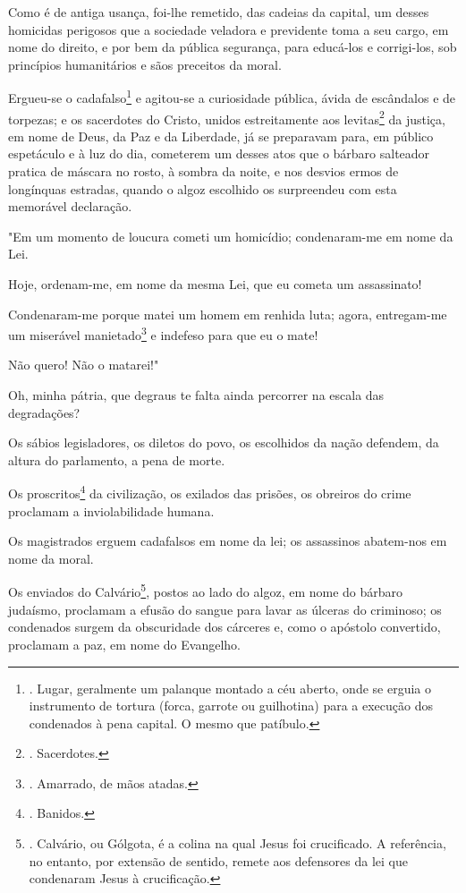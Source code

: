 Como é de antiga usança, foi-lhe remetido, das cadeias da capital, um
desses homicidas perigosos que a sociedade veladora e previdente toma a
seu cargo, em nome do direito, e por bem da pública segurança, para
educá-los e corrigi-los, sob princípios humanitários e sãos preceitos da
moral.

Ergueu-se o cadafalso\footnote{. Lugar, geralmente um palanque montado a
  céu aberto, onde se erguia o instrumento de tortura (forca, garrote ou
  guilhotina) para a execução dos condenados à pena capital. O mesmo que
  patíbulo.} e agitou-se a curiosidade pública, ávida de escândalos e de
torpezas; e os sacerdotes do Cristo, unidos estreitamente aos
levitas\footnote{. Sacerdotes.} da justiça, em nome de Deus, da Paz e da
Liberdade, já se preparavam para, em público espetáculo e à luz do dia,
cometerem um desses atos que o bárbaro salteador pratica de máscara no
rosto, à sombra da noite, e nos desvios ermos de longínquas estradas,
quando o algoz escolhido os surpreendeu com esta memorável declaração.

"Em um momento de loucura cometi um homicídio; condenaram-me em nome da
Lei.

Hoje, ordenam-me, em nome da mesma Lei, que eu cometa um assassinato!

Condenaram-me porque matei um homem em renhida luta; agora, entregam-me
um miserável manietado\footnote{. Amarrado, de mãos atadas.} e indefeso
para que eu o mate!

Não quero! Não o matarei!"

Oh, minha pátria, que degraus te falta ainda percorrer na escala das
degradações?

Os sábios legisladores, os diletos do povo, os escolhidos da nação
defendem, da altura do parlamento, a pena de morte.

Os proscritos\footnote{. Banidos.} da civilização, os exilados das
prisões, os obreiros do crime proclamam a inviolabilidade humana.

Os magistrados erguem cadafalsos em nome da lei; os assassinos
abatem-nos em nome da moral.

Os enviados do Calvário\footnote{. Calvário, ou Gólgota, é a colina na
  qual Jesus foi crucificado. A referência, no entanto, por extensão de
  sentido, remete aos defensores da lei que condenaram Jesus à
  crucificação.}, postos ao lado do algoz, em nome do bárbaro judaísmo,
proclamam a efusão do sangue para lavar as úlceras do criminoso; os
condenados surgem da obscuridade dos cárceres e, como o apóstolo
convertido, proclamam a paz, em nome do Evangelho.

